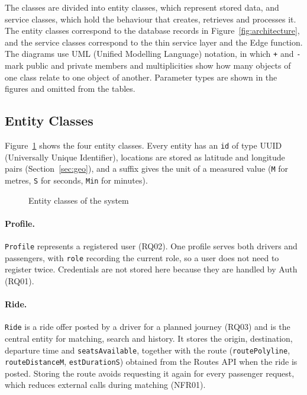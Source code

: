{The classes are divided into entity classes, which represent stored data, and service classes, which hold the behaviour that creates, retrieves and processes it. The entity classes correspond to the database records in Figure~\ref{fig:architecture}, and the service classes correspond to the thin service layer and the Edge function. The diagrams use UML (Unified Modelling Language) notation, in which \texttt{+} and \texttt{-} mark public and private members and multiplicities show how many objects of one class relate to one object of another. Parameter types are shown in the figures and omitted from the tables.

\subsection{Entity Classes}
\label{sec:entityclasses}

Figure~\ref{fig:entity} shows the four entity classes. Every entity has an \texttt{id} of type UUID (Universally Unique Identifier), locations are stored as latitude and longitude pairs (Section~\ref{sec:geo}), and a suffix gives the unit of a measured value (\texttt{M} for metres, \texttt{S} for seconds, \texttt{Min} for minutes).

\begin{figure}[htbp]
  \centering
  \caption{Entity classes of the system}
  \label{fig:entity}
\end{figure}

\paragraph{Profile.} \texttt{Profile} represents a registered user (RQ02). One profile serves both drivers and passengers, with \texttt{role} recording the current role, so a user does not need to register twice. Credentials are not stored here because they are handled by Auth (RQ01).

\paragraph{Ride.} \texttt{Ride} is a ride offer posted by a driver for a planned journey (RQ03) and is the central entity for matching, search and history. It stores the origin, destination, departure time and \texttt{seatsAvailable}, together with the route (\texttt{routePolyline}, \texttt{routeDistanceM}, \texttt{estDurationS}) obtained from the Routes API when the ride is posted. Storing the route avoids requesting it again for every passenger request, which reduces external calls during matching (NFR01).

}
